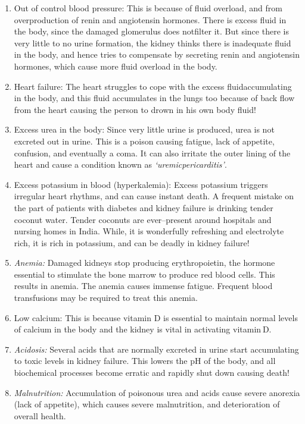 \begin{enumerate}[•]
\itemsep=1pt
\item Out of control blood pressure: This is because of fluid overload, and from overproduction of renin and angiotensin hormones. There is excess fluid in the body, since the damaged glomerulus does not\break filter it. But since there is very little to no urine formation, the kidney thinks there is inadequate fluid in the body, and hence tries to compensate by secreting renin and angiotensin hormones, which cause more fluid overload in the body.
\item Heart failure: The heart struggles to cope with the excess fluid\break accumulating in the body, and this fluid accumulates in the lungs too because of back flow from the heart causing the person to drown in his own body fluid!
\item Excess urea in the body: Since very little urine is produced, urea is not excreted out in urine. This is a poison causing fatigue, lack of appetite, confusion, and eventually a coma. It can also irritate the outer lining of the heart and cause a condition known as \textit{‘uremic\break pericarditis’}.
\item Excess potassium in blood (hyperkalemia): Excess potassium triggers irregular heart rhythms, and can cause instant death. A frequent mistake on the part of patients with diabetes and kidney failure is drinking tender coconut water. Tender coconuts are ever–present around hospitals and nursing homes in India. While, it is wonderfully refreshing and electrolyte rich, it is rich in potassium, and can be deadly in kidney failure!
\item \textit{Anemia:} Damaged kidneys stop producing erythropoietin, the hormone essential to stimulate the bone marrow to produce red blood cells. This results in anemia. The anemia causes immense fatigue. Frequent blood transfusions may be required to treat this anemia.
\item Low calcium: This is because vitamin D is essential to maintain normal levels of calcium in the body and the kidney is vital in activating vitamin D.
\item \textit{Acidosis:} Several acids that are normally excreted in urine start accumulating to toxic levels in kidney failure. This lowers the pH of the body, and all biochemical processes become erratic and rapidly shut down causing death!
\item \textit{Malnutrition:} Accumulation of poisonous urea and acids cause severe anorexia (lack of appetite), which causes severe malnutrition, and deterioration of overall health.
\end{enumerate}

